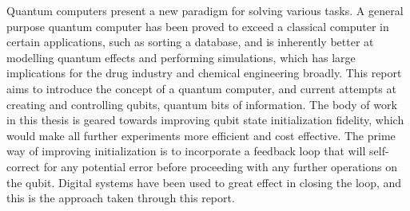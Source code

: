 Quantum computers present a new paradigm for solving various tasks. A general purpose quantum computer has been proved to exceed a classical computer in certain applications, such as sorting a database, and is inherently better at modelling quantum effects and performing simulations, which has large implications for the drug industry and chemical engineering broadly. This report aims to introduce the concept of a quantum computer, and current attempts at creating and controlling qubits, quantum bits of information. The body of work in this thesis is geared towards improving qubit state initialization fidelity, which would make all further experiments more efficient and cost effective. The prime way of improving initialization is to incorporate a feedback loop that will self-correct for any potential error before proceeding with any further operations on the qubit. Digital systems have been used to great effect in closing the loop, and this is the approach taken through this report.